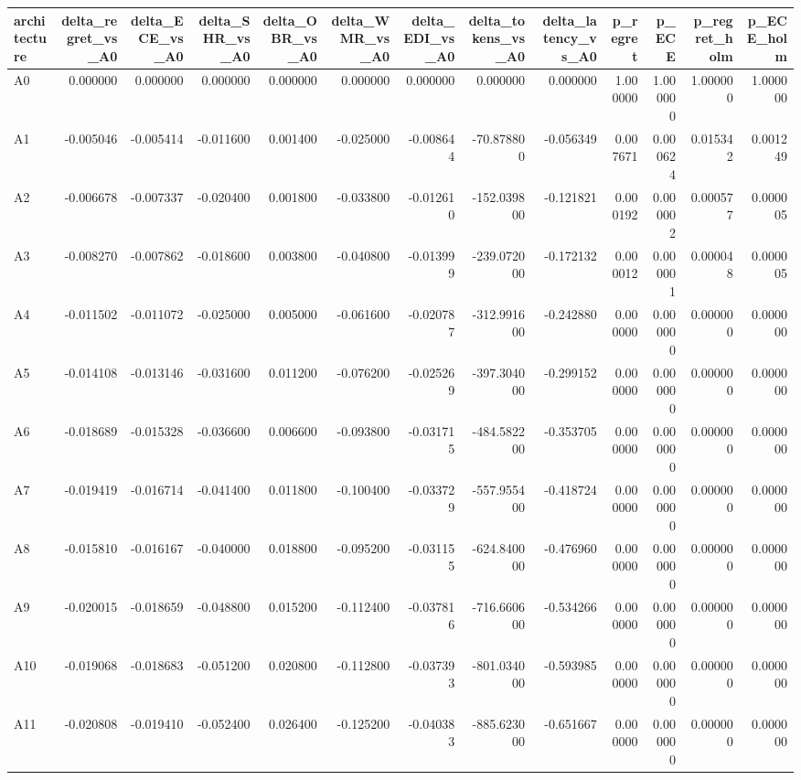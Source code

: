 \begin{tabular}{lrrrrrrrrrrrr}
\toprule
architecture & delta_regret_vs_A0 & delta_ECE_vs_A0 & delta_SHR_vs_A0 & delta_OBR_vs_A0 & delta_WMR_vs_A0 & delta_EDI_vs_A0 & delta_tokens_vs_A0 & delta_latency_vs_A0 & p_regret & p_ECE & p_regret_holm & p_ECE_holm \\
\midrule
A0 & 0.000000 & 0.000000 & 0.000000 & 0.000000 & 0.000000 & 0.000000 & 0.000000 & 0.000000 & 1.000000 & 1.000000 & 1.000000 & 1.000000 \\
A1 & -0.005046 & -0.005414 & -0.011600 & 0.001400 & -0.025000 & -0.008644 & -70.878800 & -0.056349 & 0.007671 & 0.000624 & 0.015342 & 0.001249 \\
A2 & -0.006678 & -0.007337 & -0.020400 & 0.001800 & -0.033800 & -0.012610 & -152.039800 & -0.121821 & 0.000192 & 0.000002 & 0.000577 & 0.000005 \\
A3 & -0.008270 & -0.007862 & -0.018600 & 0.003800 & -0.040800 & -0.013999 & -239.072000 & -0.172132 & 0.000012 & 0.000001 & 0.000048 & 0.000005 \\
A4 & -0.011502 & -0.011072 & -0.025000 & 0.005000 & -0.061600 & -0.020787 & -312.991600 & -0.242880 & 0.000000 & 0.000000 & 0.000000 & 0.000000 \\
A5 & -0.014108 & -0.013146 & -0.031600 & 0.011200 & -0.076200 & -0.025269 & -397.304000 & -0.299152 & 0.000000 & 0.000000 & 0.000000 & 0.000000 \\
A6 & -0.018689 & -0.015328 & -0.036600 & 0.006600 & -0.093800 & -0.031715 & -484.582200 & -0.353705 & 0.000000 & 0.000000 & 0.000000 & 0.000000 \\
A7 & -0.019419 & -0.016714 & -0.041400 & 0.011800 & -0.100400 & -0.033729 & -557.955400 & -0.418724 & 0.000000 & 0.000000 & 0.000000 & 0.000000 \\
A8 & -0.015810 & -0.016167 & -0.040000 & 0.018800 & -0.095200 & -0.031155 & -624.840000 & -0.476960 & 0.000000 & 0.000000 & 0.000000 & 0.000000 \\
A9 & -0.020015 & -0.018659 & -0.048800 & 0.015200 & -0.112400 & -0.037816 & -716.660600 & -0.534266 & 0.000000 & 0.000000 & 0.000000 & 0.000000 \\
A10 & -0.019068 & -0.018683 & -0.051200 & 0.020800 & -0.112800 & -0.037393 & -801.034000 & -0.593985 & 0.000000 & 0.000000 & 0.000000 & 0.000000 \\
A11 & -0.020808 & -0.019410 & -0.052400 & 0.026400 & -0.125200 & -0.040383 & -885.623000 & -0.651667 & 0.000000 & 0.000000 & 0.000000 & 0.000000 \\
\bottomrule
\end{tabular}

